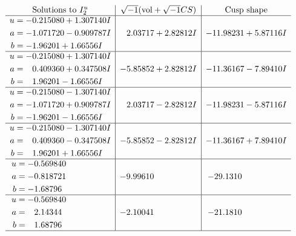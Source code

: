 \documentclass[1p]{elsarticle_modified}
\theoremstyle{definition}
\newcommand{\I}{\sqrt{-1}}
\begin{document}
$$\begin{array}{c|c|c}  
\text{Solutions to }I^u_{2}& \I (\text{vol} + \sqrt{-1}CS) & \text{Cusp shape}\\
 \hline 
\begin{aligned}
u &= -0.215080 + 1.307140 I \\
a &= -1.071720 - 0.909787 I \\
b &= -1.96201 + 1.66556 I\end{aligned}
 & \phantom{-}2.03717 + 2.82812 I & -11.98231 + 5.87116 I \\ \hline\begin{aligned}
u &= -0.215080 + 1.307140 I \\
a &= \phantom{-}0.409360 + 0.347508 I \\
b &= \phantom{-}1.96201 - 1.66556 I\end{aligned}
 & -5.85852 + 2.82812 I & -11.36167 - 7.89410 I \\ \hline\begin{aligned}
u &= -0.215080 - 1.307140 I \\
a &= -1.071720 + 0.909787 I \\
b &= -1.96201 - 1.66556 I\end{aligned}
 & \phantom{-}2.03717 - 2.82812 I & -11.98231 - 5.87116 I \\ \hline\begin{aligned}
u &= -0.215080 - 1.307140 I \\
a &= \phantom{-}0.409360 - 0.347508 I \\
b &= \phantom{-}1.96201 + 1.66556 I\end{aligned}
 & -5.85852 - 2.82812 I & -11.36167 + 7.89410 I \\ \hline\begin{aligned}
u &= -0.569840\phantom{ +0.000000I} \\
a &= -0.818721\phantom{ +0.000000I} \\
b &= -1.68796\phantom{ +0.000000I}\end{aligned}
 & -9.99610\phantom{ +0.000000I} & -29.1310\phantom{ +0.000000I} \\ \hline\begin{aligned}
u &= -0.569840\phantom{ +0.000000I} \\
a &= \phantom{-}2.14344\phantom{ +0.000000I} \\
b &= \phantom{-}1.68796\phantom{ +0.000000I}\end{aligned}
 & -2.10041\phantom{ +0.000000I} & -21.1810\phantom{ +0.000000I}\\
 \hline 
 \end{array}$$\newpage
\end{document}
